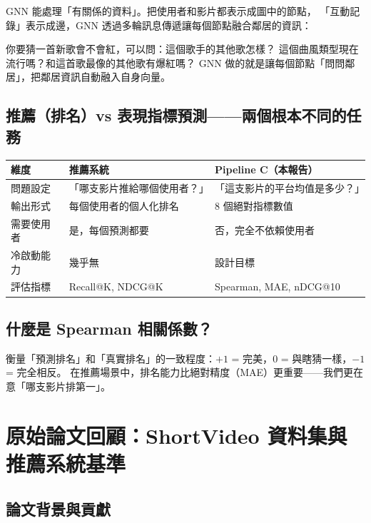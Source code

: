\documentclass[12pt, a4paper]{article}
\begin{document}
GNN 能處理「有關係的資料」。把使用者和影片都表示成圖中的節點，
「互動記錄」表示成邊，GNN 透過多輪訊息傳遞讓每個節點融合鄰居的資訊：

\begin{analogybox}[訊息傳遞的生活類比]
你要猜一首新歌會不會紅，可以問：這個歌手的其他歌怎樣？
這個曲風類型現在流行嗎？和這首歌最像的其他歌有爆紅嗎？
GNN 做的就是讓每個節點「問問鄰居」，把鄰居資訊自動融入自身向量。
\end{analogybox}

\subsection*{推薦（排名）vs 表現指標預測——兩個根本不同的任務}

\begin{center}
\begin{tabular}{lll}
\toprule
\textbf{維度} & \textbf{推薦系統} & \textbf{Pipeline C（本報告）} \\
\midrule
問題設定 & 「哪支影片推給哪個使用者？」 & 「這支影片的平台均值是多少？」\\
輸出形式 & 每個使用者的個人化排名 & 8 個絕對指標數值 \\
需要使用者 & 是，每個預測都要 & 否，完全不依賴使用者 \\
冷啟動能力 & 幾乎無 & 設計目標 \\
評估指標 & Recall@K, NDCG@K & Spearman, MAE, nDCG@10 \\
\bottomrule
\end{tabular}
\end{center}

\subsection*{什麼是 Spearman 相關係數？}

衡量「預測排名」和「真實排名」的一致程度：$+1$ = 完美，$0$ = 與瞎猜一樣，$-1$ = 完全相反。
在推薦場景中，排名能力比絕對精度（MAE）更重要——我們更在意「哪支影片排第一」。

\section{原始論文回顧：ShortVideo 資料集與推薦系統基準}
\label{sec:original}

\subsection{論文背景與貢獻}
\end{document}
